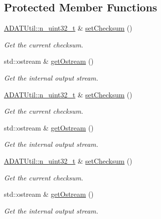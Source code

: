 \subsection*{Protected Member Functions}
\begin{DoxyCompactItemize}
\item 
\mbox{\hyperlink{namespaceADATUtil_ad945a8afa4db2d1f89b731964adae97e}{A\+D\+A\+T\+Util\+::n\+\_\+uint32\+\_\+t}} \& \mbox{\hyperlink{classADATIO_1_1BinaryBufferWriter_af4cc523a862ce29a96f1a813f254360e}{set\+Checksum}} ()
\begin{DoxyCompactList}\small\item\em Get the current checksum. \end{DoxyCompactList}\item 
std\+::ostream \& \mbox{\hyperlink{classADATIO_1_1BinaryBufferWriter_a587ce48f0cf6dd4064edde6db836c0a3}{get\+Ostream}} ()
\begin{DoxyCompactList}\small\item\em Get the internal output stream. \end{DoxyCompactList}\item 
\mbox{\hyperlink{namespaceADATUtil_ad945a8afa4db2d1f89b731964adae97e}{A\+D\+A\+T\+Util\+::n\+\_\+uint32\+\_\+t}} \& \mbox{\hyperlink{classADATIO_1_1BinaryBufferWriter_af4cc523a862ce29a96f1a813f254360e}{set\+Checksum}} ()
\begin{DoxyCompactList}\small\item\em Get the current checksum. \end{DoxyCompactList}\item 
std\+::ostream \& \mbox{\hyperlink{classADATIO_1_1BinaryBufferWriter_a587ce48f0cf6dd4064edde6db836c0a3}{get\+Ostream}} ()
\begin{DoxyCompactList}\small\item\em Get the internal output stream. \end{DoxyCompactList}\item 
\mbox{\hyperlink{namespaceADATUtil_ad945a8afa4db2d1f89b731964adae97e}{A\+D\+A\+T\+Util\+::n\+\_\+uint32\+\_\+t}} \& \mbox{\hyperlink{classADATIO_1_1BinaryBufferWriter_af4cc523a862ce29a96f1a813f254360e}{set\+Checksum}} ()
\begin{DoxyCompactList}\small\item\em Get the current checksum. \end{DoxyCompactList}\item 
std\+::ostream \& \mbox{\hyperlink{classADATIO_1_1BinaryBufferWriter_a587ce48f0cf6dd4064edde6db836c0a3}{get\+Ostream}} ()
\begin{DoxyCompactList}\small\item\em Get the internal output stream. \end{DoxyCompactList}\end{DoxyCompactItemize}


